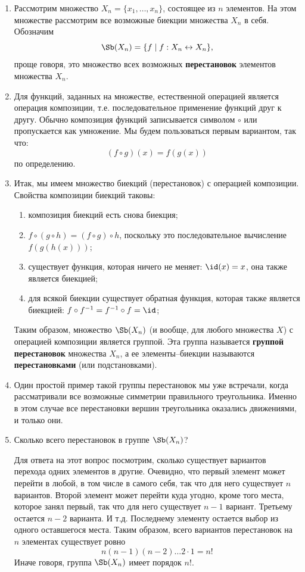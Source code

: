 \begin{enumerate}
\item Рассмотрим множество $X_n=\{x_1,\dots,x_n\}$, состоящее из $n$ элементов. На этом множестве рассмотрим все возможные биекции множества $X_n$ в себя. Обозначим
$$
\Sb(X_n) = \{f\mid f:X_n\leftrightarrow X_n\},
$$
проще говоря, это множество всех возможных \textbf{перестановок} элементов множества $X_n$.
\item Для функций, заданных на множестве, естественной операцией является операция композиции, т.е. последовательное применение функций друг к другу. Обычно композиция функций записывается символом $\circ$ или пропускается как умножение. Мы будем пользоваться первым вариантом, так что:
$$
(f\circ g)(x) = f(g(x))
$$
по определению.
\item Итак, мы имеем множество биекций (перестановок) с операцией композиции. Свойства композиции биекций таковы:
\begin{enumerate}[1.]
\item композиция биекций есть снова биекция;
\item $f\circ (g\circ h) = (f\circ g)\circ h$, поскольку это последовательное вычисление $f(g(h(x)))$;
\item существует функция, которая ничего не меняет: $\id(x)=x$, она также является биекцией;
\item для всякой биекции существует обратная функция, которая также является биекцией: $f\circ f^{-1}=f^{-1}\circ f=\id$;
\end{enumerate}

Таким образом, множество $\Sb(X_n)$ (и вообще, для любого множества $X$) с операцией композиции является группой. Эта группа называется \textbf{группой перестановок} множества $X_n$, а ее элементы--биекции называются \textbf{перестановками} (или подстановками).
\item Один простой пример такой группы перестановок мы уже встречали, когда рассматривали все возможные симметрии правильного треугольника. Именно в этом случае все перестановки вершин треугольника оказались движениями, и только они.
\item Сколько всего перестановок в группе $\Sb(X_n)$?

Для ответа на этот вопрос посмотрим, сколько существует вариантов перехода одних элементов в другие. Очевидно, что первый элемент может перейти в любой, в том числе в самого себя, так что для него существует $n$ вариантов. Второй элемент может перейти куда угодно, кроме того места, которое занял первый, так что для него существует $n-1$ вариант. Третьему остается $n-2$ варианта. И т.д. Последнему элементу остается выбор из одного оставшегося места. Таким образом, всего вариантов перестановок на $n$ элементах существует ровно
$$
n(n-1)(n-2)\dots 2\cdot 1=n!
$$
Иначе говоря, группа $\Sb(X_n)$ имеет порядок $n!$.


\end{enumerate}
